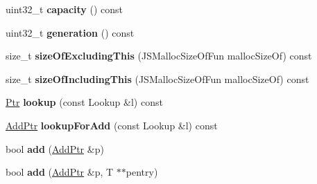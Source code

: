 \begin{DoxyCompactItemize}
\item 
\hypertarget{classjs_1_1detail_1_1_hash_table_ae791015941670800f625a1ec61c08c01}{uint32\-\_\-t {\bfseries capacity} () const }\label{classjs_1_1detail_1_1_hash_table_ae791015941670800f625a1ec61c08c01}

\item 
\hypertarget{classjs_1_1detail_1_1_hash_table_a86ac700b64c261b64bd2c1bfa35c332a}{uint32\-\_\-t {\bfseries generation} () const }\label{classjs_1_1detail_1_1_hash_table_a86ac700b64c261b64bd2c1bfa35c332a}

\item 
\hypertarget{classjs_1_1detail_1_1_hash_table_a02ff96593ecb2bab55f2e92ff6690f52}{size\-\_\-t {\bfseries size\-Of\-Excluding\-This} (J\-S\-Malloc\-Size\-Of\-Fun malloc\-Size\-Of) const }\label{classjs_1_1detail_1_1_hash_table_a02ff96593ecb2bab55f2e92ff6690f52}

\item 
\hypertarget{classjs_1_1detail_1_1_hash_table_a060964c6da2da4a14c1b2e7ebb90d3dc}{size\-\_\-t {\bfseries size\-Of\-Including\-This} (J\-S\-Malloc\-Size\-Of\-Fun malloc\-Size\-Of) const }\label{classjs_1_1detail_1_1_hash_table_a060964c6da2da4a14c1b2e7ebb90d3dc}

\item 
\hypertarget{classjs_1_1detail_1_1_hash_table_a433f1c764c7d754ad496e5d0a04d243b}{\hyperlink{classjs_1_1detail_1_1_hash_table_1_1_ptr}{Ptr} {\bfseries lookup} (const Lookup \&l) const }\label{classjs_1_1detail_1_1_hash_table_a433f1c764c7d754ad496e5d0a04d243b}

\item 
\hypertarget{classjs_1_1detail_1_1_hash_table_a29716675791302783a483ee83b1b3c8f}{\hyperlink{classjs_1_1detail_1_1_hash_table_1_1_add_ptr}{Add\-Ptr} {\bfseries lookup\-For\-Add} (const Lookup \&l) const }\label{classjs_1_1detail_1_1_hash_table_a29716675791302783a483ee83b1b3c8f}

\item 
\hypertarget{classjs_1_1detail_1_1_hash_table_a8107a954216f10623bed24f16a32b2e5}{bool {\bfseries add} (\hyperlink{classjs_1_1detail_1_1_hash_table_1_1_add_ptr}{Add\-Ptr} \&p)}\label{classjs_1_1detail_1_1_hash_table_a8107a954216f10623bed24f16a32b2e5}

\item 
\hypertarget{classjs_1_1detail_1_1_hash_table_ad983e60328806a937cb0d80ec1986510}{bool {\bfseries add} (\hyperlink{classjs_1_1detail_1_1_hash_table_1_1_add_ptr}{Add\-Ptr} \&p, T $\ast$$\ast$pentry)}\label{classjs_1_1detail_1_1_hash_table_ad983e60328806a937cb0d80ec1986510}


\end{DoxyCompactItemize}
